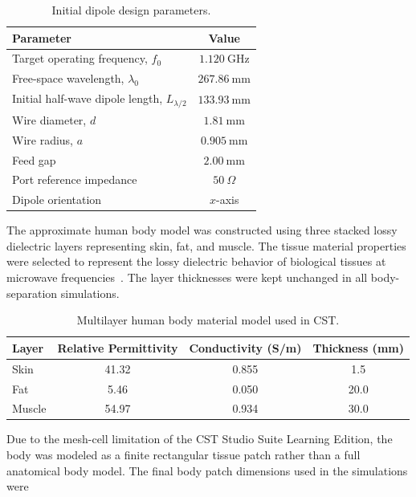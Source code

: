 \begin{table}[htbp]
\centering
\caption{Initial dipole design parameters.}
\label{tab:initial-dipole-parameters}
\begin{tabular}{lc}
\hline
\textbf{Parameter} & \textbf{Value} \\
\hline
Target operating frequency, \(f_0\) & \(1.120~\mathrm{GHz}\) \\
Free-space wavelength, \(\lambda_0\) & \(267.86~\mathrm{mm}\) \\
Initial half-wave dipole length, \(L_{\lambda/2}\) & \(133.93~\mathrm{mm}\) \\
Wire diameter, \(d\) & \(1.81~\mathrm{mm}\) \\
Wire radius, \(a\) & \(0.905~\mathrm{mm}\) \\
Feed gap & \(2.00~\mathrm{mm}\) \\
Port reference impedance & \(50~\Omega\) \\
Dipole orientation & \(x\)-axis \\
\hline
\end{tabular}
\end{table}

The approximate human body model was constructed using three stacked lossy dielectric layers representing skin, fat, and muscle. The tissue material properties were selected to represent the lossy dielectric behavior of biological tissues at microwave frequencies~\cite{gabriel1996tissue}. The layer thicknesses were kept unchanged in all body-separation simulations.

\begin{table}[htbp]
\centering
\caption{Multilayer human body material model used in CST.}
\label{tab:body-materials}
\begin{tabular}{lccc}
\hline
\textbf{Layer} & \textbf{Relative Permittivity} & \textbf{Conductivity (S/m)} & \textbf{Thickness (mm)} \\
\hline
Skin & 41.32 & 0.855 & 1.5 \\
Fat & 5.46 & 0.050 & 20.0 \\
Muscle & 54.97 & 0.934 & 30.0 \\
\hline
\end{tabular}
\end{table}

Due to the mesh-cell limitation of the CST Studio Suite Learning Edition, the body was modeled as a finite rectangular tissue patch rather than a full anatomical body model. The final body patch dimensions used in the simulations were

